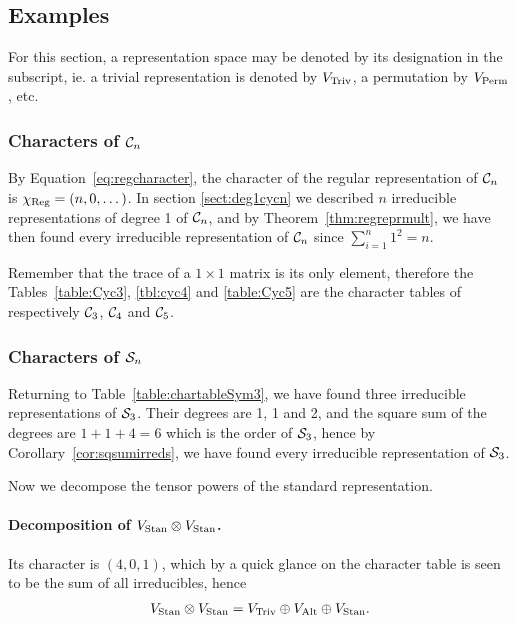 {\allowdisplaybreaks\subsection{Examples}


\begin{notation}
	For this section, a representation space may be denoted by its designation in the subscript, ie. a trivial representation is denoted 
	by $V_{\text{Triv}}$, a permutation by $V_{\text{Perm}}$, etc.
\end{notation}

\subsubsection{Characters of $\mathcal{C}_n$}

\begin{example}
	By Equation~\ref{eq:regcharacter}, the character of the regular representation of $\mathcal{C}_n$ is $\chi_{\text{Reg}} = (n, 0, \dots)$. In section \ref{sect:deg1cycn} we described $n$ irreducible representations of degree 1 of  $\mathcal{C}_n$, and by Theorem~\ref{thm:regreprmult}, we have then found every irreducible representation of $\mathcal{C}_n$ since $\sum_{i=1}^n 1^2 = n$.
	
	Remember that the trace of a $1 \times 1$ matrix is its only element, therefore the Tables~\ref{table:Cyc3}, \ref{tbl:cyc4} and \ref{table:Cyc5} are the character tables of respectively $\mathcal{C}_3$, $\mathcal{C}_4$ and $\mathcal{C}_5$.
\end{example}

\subsubsection{Characters of $\mathcal{S}_n$}
	
\begin{example}
	Returning to Table~\ref{table:chartableSym3}, we have found three irreducible representations of $\mathcal{S}_3$. Their degrees are 1, 1 and 2, and the square sum of the degrees are $1 + 1 + 4 = 6$ which is the order of $\mathcal{S}_3$, hence by Corollary~\ref{cor:sqsumirreds}, we have found every irreducible representation of $\mathcal{S}_3$. 
	
	Now we decompose the tensor powers of the standard representation.
	
	\paragraph{Decomposition of $V_{\text{Stan}} \otimes V_{\text{Stan}}$.} Its character is $(4,0,1)$, which by a quick glance on the character table is seen to be the sum of all irreducibles, hence \begin{align*}
		V_{\text{Stan}} \otimes V_{\text{Stan}} = V_{\text{Triv}} \oplus V_{\text{Alt}} \oplus V_{\text{Stan}}.
	\end{align*}
	

\end{example}}
